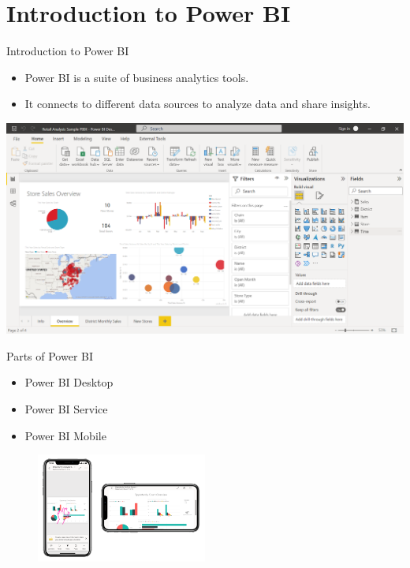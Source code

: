 \documentclass[aspectratio=169, hideothersubsections]{beamer}
\begin{document}
\section{Introduction to Power BI}
\begin{frame}{Introduction to Power BI}
  \begin{itemize}
    \item Power BI is a suite of business analytics tools.
    \item It connects to different data sources to analyze data and share insights.
  \end{itemize}
  \includegraphics[width=\textwidth]{pb1.png}
\end{frame}

\begin{frame}{Parts of Power BI}
  \begin{itemize}
    \item Power BI Desktop
    \item Power BI Service
    \item Power BI Mobile
  \end{itemize}
 \begin{figure}
  \centering
  \includegraphics[width=0.5\textwidth]{pb2.png}
  \label{fig:example}
\end{figure}
\end{frame}
\end{document}
